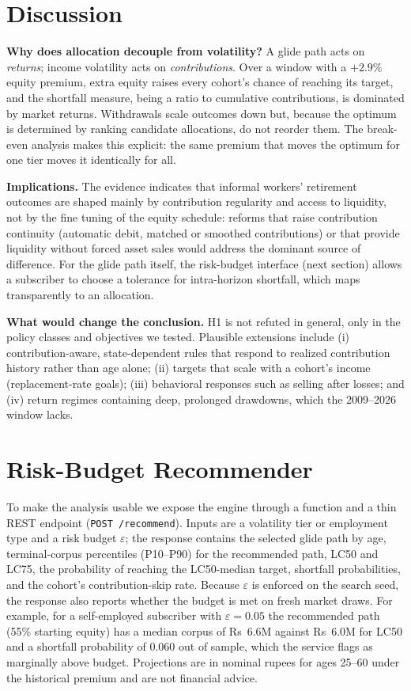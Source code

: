 \documentclass[conference]{IEEEtran}
\begin{document}
\FloatBarrier
\section{Discussion}
\textbf{Why does allocation decouple from volatility?} A glide path acts on \emph{returns}; income volatility acts on \emph{contributions}. Over a window with a $+2.9\%$ equity premium, extra equity raises every cohort's chance of reaching its target, and the shortfall measure, being a ratio to cumulative contributions, is dominated by market returns. Withdrawals scale outcomes down but, because the optimum is determined by ranking candidate allocations, do not reorder them. The break-even analysis makes this explicit: the same premium that moves the optimum for one tier moves it identically for all.

\textbf{Implications.} The evidence indicates that informal workers' retirement outcomes are shaped mainly by contribution regularity and access to liquidity, not by the fine tuning of the equity schedule: reforms that raise contribution continuity (automatic debit, matched or smoothed contributions) or that provide liquidity without forced asset sales would address the dominant source of difference. For the glide path itself, the risk-budget interface (next section) allows a subscriber to choose a tolerance for intra-horizon shortfall, which maps transparently to an allocation.

\textbf{What would change the conclusion.} H1 is not refuted in general, only in the policy classes and objectives we tested. Plausible extensions include (i) contribution-aware, state-dependent rules that respond to realized contribution history rather than age alone; (ii) targets that scale with a cohort's income (replacement-rate goals); (iii) behavioral responses such as selling after losses; and (iv) return regimes containing deep, prolonged drawdowns, which the 2009--2026 window lacks.

\FloatBarrier
\section{Risk-Budget Recommender}
To make the analysis usable we expose the engine through a function and a thin REST endpoint (\texttt{POST /recommend}). Inputs are a volatility tier or employment type and a risk budget $\varepsilon$; the response contains the selected glide path by age, terminal-corpus percentiles (P10--P90) for the recommended path, LC50 and LC75, the probability of reaching the LC50-median target, shortfall probabilities, and the cohort's contribution-skip rate. Because $\varepsilon$ is enforced on the search seed, the response also reports whether the budget is met on fresh market draws. For example, for a self-employed subscriber with $\varepsilon=0.05$ the recommended path (55\% starting equity) has a median corpus of Rs~6.6M against Rs~6.0M for LC50 and a shortfall probability of $0.060$ out of sample, which the service flags as marginally above budget. Projections are in nominal rupees for ages 25--60 under the historical premium and are not financial advice.
\end{document}

